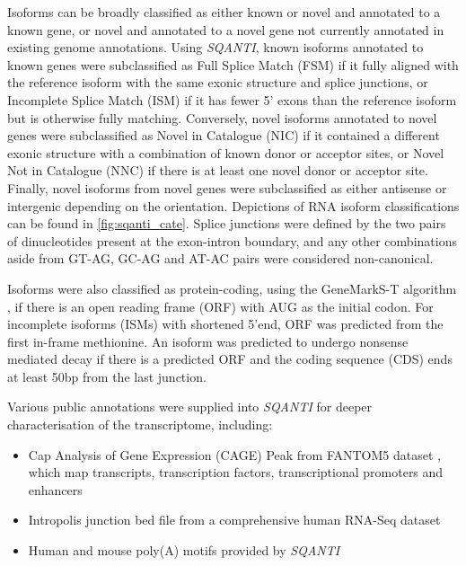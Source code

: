 Isoforms can be broadly classified as either known or novel and annotated to a known gene, or novel and annotated to a novel gene not currently annotated in existing genome annotations. Using \textit{SQANTI}, known isoforms annotated to known genes were subclassified as Full Splice Match (FSM) if it fully aligned with the reference isoform with the same exonic structure and splice junctions, or Incomplete Splice Match (ISM) if it has fewer 5’ exons than the reference isoform but is otherwise fully matching. Conversely, novel isoforms annotated to novel genes were subclassified as Novel in Catalogue (NIC) if it contained a different exonic structure with a combination of known donor or acceptor sites, or Novel Not in Catalogue (NNC) if there is at least one novel donor or acceptor site. Finally, novel isoforms from novel genes were subclassified as either antisense or intergenic depending on the orientation. Depictions of RNA isoform classifications can be found in \cref{fig:sqanti_cate}. Splice junctions were defined by the two pairs of dinucleotides present at the exon-intron boundary, and any other combinations aside from GT-AG, GC-AG and AT-AC pairs were considered non-canonical. 

Isoforms were also classified as protein-coding, using the GeneMarkS-T algorithm \cite{Tang2015}, if there is an open reading frame (ORF) with AUG as the initial codon. For incomplete isoforms (ISMs) with shortened 5'end, ORF was predicted from the first in-frame methionine. An isoform was predicted to undergo nonsense mediated decay if there is a predicted ORF and the coding sequence (CDS) ends at least 50bp from the last junction. 

Various public annotations were supplied into \textit{SQANTI} for deeper characterisation of the transcriptome, including:
\begin{itemize}
	\item Cap Analysis of Gene Expression (CAGE) Peak from FANTOM5 dataset \cite{Lizio2019}, which map transcripts, transcription factors, transcriptional promoters and enhancers
	\item Intropolis junction bed file\cite{Nellore2016} from a comprehensive human RNA-Seq dataset
	\item Human and mouse poly(A) motifs provided by \textit{SQANTI}	 
\end{itemize}

